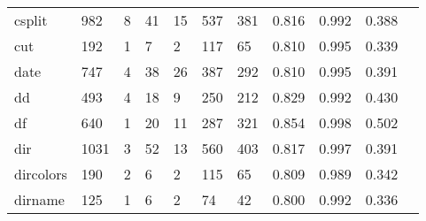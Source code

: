 \begin{longtable}{lp{1.10cm}p{1.10cm}p{1.10cm}p{1.10cm}p{1.10cm}p{1.10cm}p{1.10cm}p{1.10cm}p{1.10cm}p{1.10cm}}
csplit    &                    982 &                                  8 &                                41 &                               15 &                               537 &                             381 &                             0.816 &                                 0.992 &                               0.388 \\
cut       &                    192 &                                  1 &                                 7 &                                2 &                               117 &                              65 &                             0.810 &                                 0.995 &                               0.339 \\
date      &                    747 &                                  4 &                                38 &                               26 &                               387 &                             292 &                             0.810 &                                 0.995 &                               0.391 \\
dd        &                    493 &                                  4 &                                18 &                                9 &                               250 &                             212 &                             0.829 &                                 0.992 &                               0.430 \\
df        &                    640 &                                  1 &                                20 &                               11 &                               287 &                             321 &                             0.854 &                                 0.998 &                               0.502 \\
dir       &                   1031 &                                  3 &                                52 &                               13 &                               560 &                             403 &                             0.817 &                                 0.997 &                               0.391 \\
dircolors &                    190 &                                  2 &                                 6 &                                2 &                               115 &                              65 &                             0.809 &                                 0.989 &                               0.342 \\
dirname   &                    125 &                                  1 &                                 6 &                                2 &                                74 &                              42 &                             0.800 &                                 0.992 &                               0.336 \\

\end{longtable}

